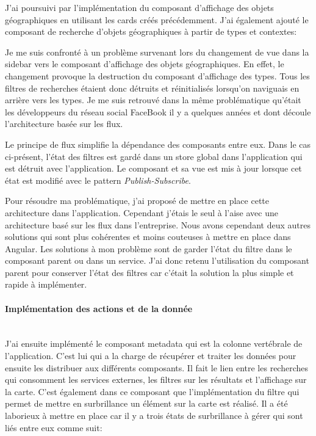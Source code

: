 \documentclass{rapportUHA40}
\begin{document}
J'ai poursuivi par l'implémentation du composant d'affichage des objets
géographiques en utilisant les cards créés précédemment. J'ai également ajouté
le composant de recherche d'objets géographiques à partir de types et
contextes: 

Je me suis confronté à un problème survenant lors du changement de vue dans la
sidebar vers le composant d'affichage des objets géographiques. En effet, le
changement provoque la destruction du composant d'affichage des types. Tous les
filtres de recherches étaient donc détruits et réinitialisés lorsqu'on
naviguais en arrière vers les types. Je me suis retrouvé dans la même
problématique qu'était les développeurs du réseau social FaceBook il y a
quelques années et dont découle l'architecture basée sur les flux.


Le principe de flux simplifie la dépendance des composants entre eux. Dans le
cas ci-présent, l'état des filtres est gardé dans un store global dans
l'application qui est détruit avec l'application. Le composant et sa vue est
mis à jour lorsque cet état est modifié avec le pattern
\textit{Publish-Subscribe}.

Pour résoudre ma problématique, j'ai proposé de mettre en place cette
architecture dans l'application. Cependant j'étais le seul à l'aise avec une
architecture basé sur les flux dans l'entreprise. Nous avons cependant deux
autres solutions qui sont plus cohérentes et moins couteuses à mettre en place
dans Angular. Les solutions à mon problème sont de garder l'état du filtre dans
le composant parent ou dans un service. J'ai donc retenu l'utilisation du
composant parent pour conserver l'état des filtres car c'était la solution la
plus simple et rapide à implémenter.\\

\paragraph{Implémentation des actions et de la donnée}\mbox{}\\
J'ai ensuite implémenté le composant metadata qui est la colonne vertébrale de
l'application. C'est lui qui a la charge de récupérer et traiter les données
pour ensuite les distribuer aux différents composants. Il fait le lien entre
les recherches qui consomment les services externes, les filtres sur les
résultats et l'affichage sur la carte. C'est également dans ce composant que
l'implémentation du filtre  \fg{} qui permet de mettre en
surbrillance un élément sur la carte est réalisé. Il a été laborieux à mettre
en place car il y a trois états de surbrillance à gérer qui sont liés entre eux
comme suit:
\end{document}
